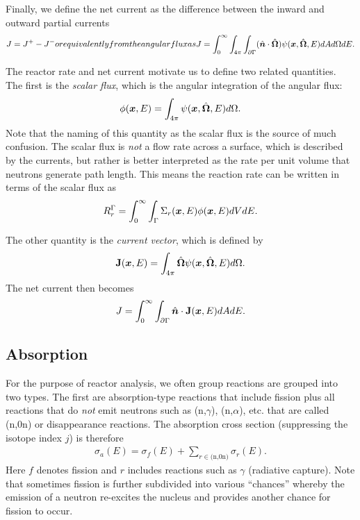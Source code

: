 Finally, we define the net current as the difference between the inward and outward partial currents
\begin{subequations}
\begin{align}
  J = J^+ - J^-
\end{align}
or equivalently from the angular flux as
\begin{align}
  J = \int_0^\infty \int_{4\pi} \int_{\partial \Gamma}  ( \nhat \cdot \dir ) \psi(\pos,\dir,E) dA d\Omega dE.
\end{align}
\end{subequations}

The reactor rate and net current motivate us to define two related quantities. The first is the \emph{scalar flux}, which is the angular integration of the angular flux:
\begin{align}
  \phi(\bm{x},E) = \int_{4\pi} \psi(\bm{x},\hat{\mathbf{\Omega}},E) d\Omega .
\end{align}
Note that the naming of this quantity as the scalar flux is the source of much confusion. The scalar flux is \emph{not} a flow rate across a surface, which is described by the currents, but rather is better interpreted as the rate per unit volume that neutrons generate path length. This means the reaction rate can be written in terms of the scalar flux as
\begin{align}
  R_r^\Gamma = \int_0^\infty \int_\Gamma \Sigma_r(\bm{x},E) \phi(\bm{x},E) dV dE.
\end{align}

The other quantity is the \emph{current vector}, which is defined by
\begin{align}
  \mathbf{J}(\bm{x},E) = \int_{4\pi} \hat{\mathbf{\Omega}} \psi(\bm{x},\hat{\mathbf{\Omega}},E) d\Omega .
\end{align}
The net current then becomes
\begin{align}
  J = \int_0^\infty \int_{\partial \Gamma} \hat{\bm{n}} \cdot \mathbf{J}(\bm{x},E) dA  dE.
\end{align}

\subsection{Absorption}

For the purpose of reactor analysis, we often group reactions are grouped into two types. The first are absorption-type reactions that include fission plus all reactions that do \emph{not} emit neutrons such as (n,$\gamma$), (n,$\alpha$), etc. that are called (n,0n) or disappearance reactions. The absorption cross section (suppressing the isotope index $j$) is therefore
\begin{align}
  \sigma_a(E) = \sigma_f(E) + \sum_{r \in \text{(n,0n)}} \sigma_r(E) .
\end{align}
Here $f$ denotes fission and $r$ includes reactions such as $\gamma$ (radiative capture). Note that sometimes fission is further subdivided into various ``chances'' whereby the emission of a neutron re-excites the nucleus and provides another chance for fission to occur.

